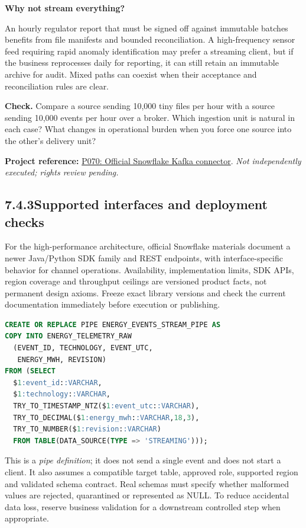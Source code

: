 \documentclass[11pt,twoside]{article}
\newcommand{\topic}[2]{\subsection*{#1\quad #2}}
\newcommand{\repo}[2]{\par\begingroup\fontsize{8.0}{9.6}\selectfont\sffamily\color{inkgray}\textbf{Project reference:} \href{#2}{#1}. \textit{Not independently executed; rights review pending.}\par\endgroup}
\begin{document}
\begin{insight}\textbf{Why not stream everything?}\par
An hourly regulator report that must be signed off against immutable batches benefits from file manifests and bounded reconciliation. A high-frequency sensor feed requiring rapid anomaly identification may prefer a streaming client, but if the business reprocesses daily for reporting, it can still retain an immutable archive for audit. Mixed paths can coexist when their acceptance and reconciliation rules are clear.\end{insight}
\textbf{Check.} Compare a source sending 10,000 tiny files per hour with a source sending 10,000 events per hour over a broker. Which ingestion unit is natural in each case? What changes in operational burden when you force one source into the other's delivery unit?
\repo{P070: Official Snowflake Kafka connector}{https://github.com/snowflakedb/snowflake-kafka-connector}
\newpage
\topic{7.4.3}{Supported interfaces and deployment checks}
For the high-performance architecture, official Snowflake materials document a newer Java/Python SDK family and REST endpoints, with interface-specific behavior for channel operations. Availability, implementation limits, SDK APIs, region coverage and throughput ceilings are versioned product facts, not permanent design axioms. Freeze exact library versions and check the current documentation immediately before execution or publishing.
\begin{lstlisting}[language=SQL,caption={Illustrative high-performance streaming pipe syntax.}]
CREATE OR REPLACE PIPE ENERGY_EVENTS_STREAM_PIPE AS
COPY INTO ENERGY_TELEMETRY_RAW
  (EVENT_ID, TECHNOLOGY, EVENT_UTC,
   ENERGY_MWH, REVISION)
FROM (SELECT
  $1:event_id::VARCHAR,
  $1:technology::VARCHAR,
  TRY_TO_TIMESTAMP_NTZ($1:event_utc::VARCHAR),
  TRY_TO_DECIMAL($1:energy_mwh::VARCHAR,18,3),
  TRY_TO_NUMBER($1:revision::VARCHAR)
  FROM TABLE(DATA_SOURCE(TYPE => 'STREAMING')));
\end{lstlisting}
This is a \emph{pipe definition}; it does not send a single event and does not start a client. It also assumes a compatible target table, approved role, supported region and validated schema contract. Real schemas must specify whether malformed values are rejected, quarantined or represented as NULL. To reduce accidental data loss, reserve business validation for a downstream controlled step when appropriate.
\end{document}
